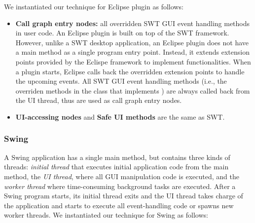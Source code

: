We instantiated our technique for Eclipse plugin as follows:


\begin{itemize}

\item \textbf{Call graph entry nodes: } all overridden SWT
GUI event handling methods in user code. An Eclipse plugin is built
on top of the SWT framework. However, unlike a SWT desktop application,
an Eclipse plugin does not have a main method as a single program entry point.
Instead, it extends extension points provided by the Eclispe framework to
implement functionalities. When a plugin starts, Eclipse
calls back the overridden extension points to handle the
upcoming events. All SWT GUI event handling methods (i.e., the overriden
methods in the class that implements ) are
always called back from the UI thread, thus are used as call graph entry nodes.


\item \textbf{UI-accessing nodes} and \textbf{Safe UI methods} are the same as SWT.

\end{itemize}

\subsubsection{Swing}


A Swing application has a single main method, but contains three kinds of
threads: \textit{initial thread} that executes initial application code from the main method,
the \textit{UI thread}, where all GUI manipulation code is executed,
and the \textit{worker thread} where time-consuming background tasks are executed.
After a Swing program starts, its initial thread exits and the UI thread takes charge
of the application and starts to execute all event-handling code or spawns new worker threads. 
We instantiated our technique for Swing as follows:

